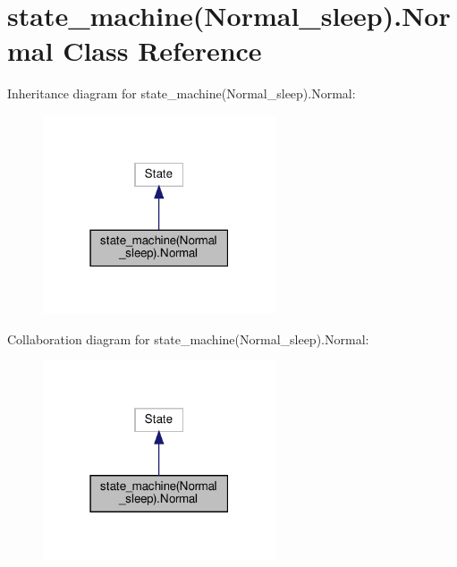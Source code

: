 \hypertarget{classstate__machine_07Normal__sleep_08_1_1Normal}{}\section{state\+\_\+machine(Normal\+\_\+sleep).Normal Class Reference}
\label{classstate__machine_07Normal__sleep_08_1_1Normal}


Inheritance diagram for state\+\_\+machine(Normal\+\_\+sleep).Normal\+:
\nopagebreak
\begin{figure}[H]
\begin{center}
\leavevmode
\includegraphics[width=195pt]{classstate__machine_07Normal__sleep_08_1_1Normal__inherit__graph}
\end{center}
\end{figure}


Collaboration diagram for state\+\_\+machine(Normal\+\_\+sleep).Normal\+:
\nopagebreak
\begin{figure}[H]
\begin{center}
\leavevmode
\includegraphics[width=195pt]{classstate__machine_07Normal__sleep_08_1_1Normal__coll__graph}
\end{center}
\end{figure}
